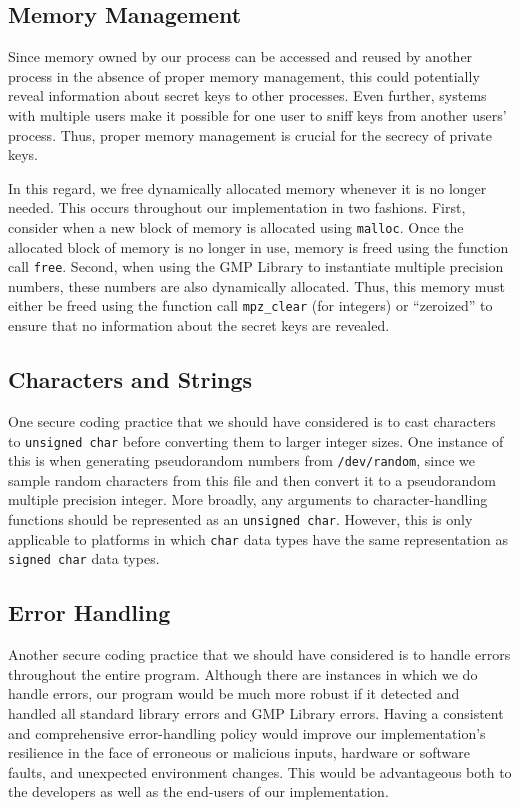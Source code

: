\documentclass[a4paper]{article}
\begin{document}
\subsection{Memory Management}

Since memory owned by our process can be accessed and reused by another process in the absence of proper memory management, this could potentially reveal information about secret keys to other processes. Even further, systems with multiple users make it possible for one user to sniff keys from another users' process. Thus, proper memory management is crucial for the secrecy of private keys.

In this regard, we free dynamically allocated memory whenever it is no longer needed. This occurs throughout our implementation in two fashions. First, consider when a new block of memory is allocated using {\tt malloc}. Once the allocated block of memory is no longer in use, memory is freed using the function call {\tt free}. Second, when using the GMP Library to instantiate multiple precision numbers, these numbers are also dynamically allocated. Thus, this memory must
either be freed using the function call {\tt mpz\_clear} (for integers) or ``zeroized'' to ensure that no information about the secret keys are revealed.

\subsection{Characters and Strings}

One secure coding practice that we should have considered is to cast characters to {\tt unsigned char} before converting them to larger integer sizes. One instance of this is when generating pseudorandom numbers from {\tt /dev/random}, since we sample random characters from this file and then convert it to a pseudorandom multiple precision integer. More broadly, any arguments to character-handling functions should be represented as an {\tt unsigned char}.
However, this is only applicable to platforms in which {\tt char} data types have the same representation as {\tt signed char} data types.

\subsection{Error Handling}

Another secure coding practice that we should have considered is to handle errors throughout the entire program. Although there are instances in which we do handle errors, our program would be much more robust if it detected and handled all standard library errors and GMP Library errors. Having a consistent and comprehensive error-handling policy would improve our implementation's resilience in the face of erroneous or malicious inputs, hardware or software faults, and
unexpected environment changes. This would be advantageous both to the developers as well as the end-users of our implementation.
\end{document}
